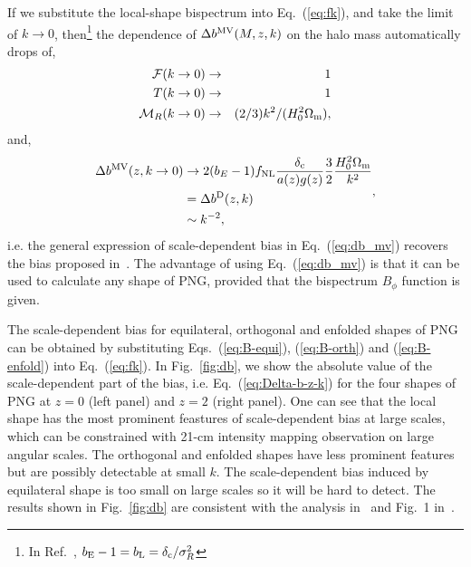\documentclass[twocolumn,floatfix,nofootinbib,aps,reprint]{revtex4}
\begin{document}
If we substitute the local-shape bispectrum into Eq.~(\ref{eq:fk}),
and take the limit of $k\rightarrow0$, then\footnote{In Ref.~\cite{2008ApJ...677L..77M}, $b_{\rm E}-1=b_{\rm L}=\delta_{\rm c}/\sigma^{2}_{R}$} the dependence of $\Delta b^{\rm MV}(M,z,k)$ on the halo mass
automatically drops of,
\begin{eqnarray}
    \mathcal{F}(k\rightarrow0) &\rightarrow& 1 \nonumber\\
    T(k\rightarrow0)             &\rightarrow& 1 \nonumber\\
    \mathcal{M}_R(k\rightarrow0) &\rightarrow& (2/3)k^2/(H_0^2\Omega_{\rm m}),\nonumber
\end{eqnarray}
and,
\begin{equation}
    \begin{split}
        \Delta b^\mathrm{MV}(z, k\rightarrow0) & \rightarrow
        2 (b_E-1) f_\mathrm{NL} \frac{\delta_{\rm c}}{a(z)g(z)} 
        \frac{3}{2}\frac{H_0^2\Omega_{\rm m}}{k^2} \\
        & = \Delta b^\mathrm{D}(z, k) \\
        & \sim k^{-2},
    \end{split},
\end{equation}
i.e. the general expression of scale-dependent bias in Eq.~(\ref{eq:db_mv}) recovers
the bias proposed in~\citet{2008PhRvD..77l3514D}. The advantage of using Eq.~(\ref{eq:db_mv}) is that it can be
used to calculate any shape of PNG, provided that the bispectrum $B_{\phi}$ function is given.


The scale-dependent bias for equilateral, orthogonal and enfolded shapes of PNG 
can be obtained by substituting Eqs.~(\ref{eq:B-equi}), (\ref{eq:B-orth}) and (\ref{eq:B-enfold})
into Eq.~(\ref{eq:fk}).  In Fig.~\ref{fig:db}, we show the absolute value of the scale-dependent part of the bias, i.e. Eq.~(\ref{eq:Delta-b-z-k}) for the four shapes of PNG at $z=0$ (left panel) and $z=2$ (right panel). One can see that the local shape has the most prominent feastures of scale-dependent bias at large scales, which can be constrained with 21-cm intensity mapping observation on large angular scales. The orthogonal and enfolded shapes have less prominent features but are possibly detectable at small $k$. The scale-dependent bias induced by equilateral shape is too small on large scales so it will be hard to detect. The results shown in Fig.~\ref{fig:db} are consistent with the analysis in~\cite{2015arXiv150705903R} and Fig.~1 in~\cite{Fedeli11}.
\end{document}

